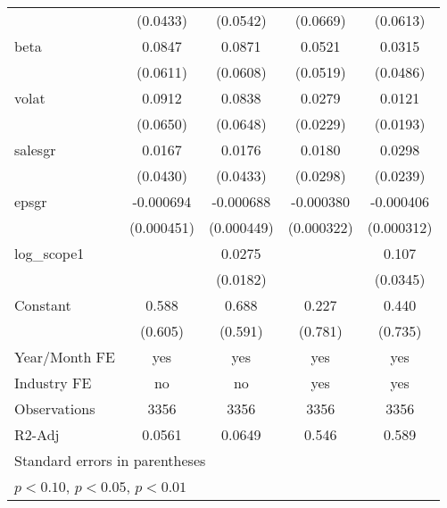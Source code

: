 \begin{table}[htbp]
\begin{tabular}{l*{4}{c}}
                    &    (0.0433)         &    (0.0542)         &    (0.0669)         &    (0.0613)         \\
[1em]
beta                &      0.0847         &      0.0871         &      0.0521         &      0.0315         \\
                    &    (0.0611)         &    (0.0608)         &    (0.0519)         &    (0.0486)         \\
[1em]
volat               &      0.0912         &      0.0838         &      0.0279         &      0.0121         \\
                    &    (0.0650)         &    (0.0648)         &    (0.0229)         &    (0.0193)         \\
[1em]
salesgr             &      0.0167         &      0.0176         &      0.0180         &      0.0298         \\
                    &    (0.0430)         &    (0.0433)         &    (0.0298)         &    (0.0239)         \\
[1em]
epsgr               &   -0.000694         &   -0.000688         &   -0.000380         &   -0.000406         \\
                    &  (0.000451)         &  (0.000449)         &  (0.000322)         &  (0.000312)         \\
[1em]
log\_scope1          &                     &      0.0275         &                     &       0.107\sym{***}\\
                    &                     &    (0.0182)         &                     &    (0.0345)         \\
[1em]
Constant            &       0.588         &       0.688         &       0.227         &       0.440         \\
                    &     (0.605)         &     (0.591)         &     (0.781)         &     (0.735)         \\
\hline
Year/Month FE       &         yes         &         yes         &         yes         &         yes         \\
Industry FE         &          no         &          no         &         yes         &         yes         \\
Observations        &        3356         &        3356         &        3356         &        3356         \\
R2-Adj              &      0.0561         &      0.0649         &       0.546         &       0.589         \\
\hline\hline
\multicolumn{5}{l}{\footnotesize Standard errors in parentheses}\\
\multicolumn{5}{l}{\footnotesize \sym{*} \(p<0.10\), \sym{**} \(p<0.05\), \sym{***} \(p<0.01\)}\\
\end{tabular}
\end{table}
